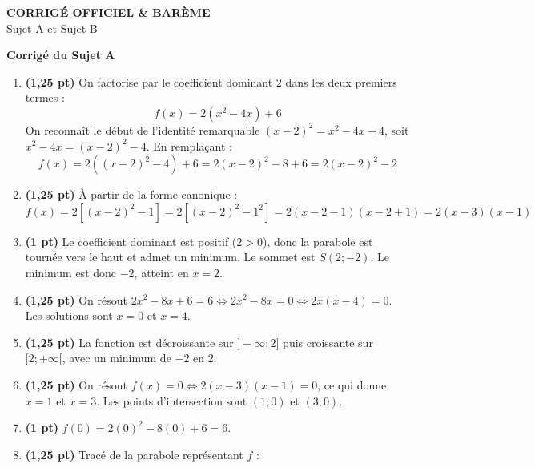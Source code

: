 \documentclass[11pt,a4paper]{article}
\newcommand{\partie}[1]{%
  \vspace{0.9em}%
  \noindent\textbf{#1}%
  \par\vspace{0.3em}%
}
\begin{document}
\newpage

\begin{center}
  {\LARGE \textbf{CORRIGÉ OFFICIEL \& BARÈME}}\\[0.4em]
  {\large Sujet A et Sujet B}
\end{center}

\partie{Corrigé du Sujet A}
\begin{enumerate}
    \item \textbf{(1,25 pt)} On factorise par le coefficient dominant $2$ dans les deux premiers termes :
    $$f(x) = 2(x^2 - 4x) + 6$$
    On reconnaît le début de l'identité remarquable $(x-2)^2 = x^2 - 4x + 4$, soit $x^2 - 4x = (x-2)^2 - 4$.
    En remplaçant :
    $$f(x) = 2\left((x-2)^2 - 4\right) + 6 = 2(x-2)^2 - 8 + 6 = 2(x-2)^2 - 2$$
    \item \textbf{(1,25 pt)} À partir de la forme canonique :
    $$f(x) = 2\left[(x-2)^2 - 1\right] = 2\left[(x-2)^2 - 1^2\right] = 2(x - 2 - 1)(x - 2 + 1) = 2(x - 3)(x - 1)$$
    \item \textbf{(1 pt)} Le coefficient dominant est positif ($2 > 0$), donc la parabole est tournée vers le haut et admet un minimum. Le sommet est $S(2 ; -2)$. Le minimum est donc $-2$, atteint en $x = 2$.
    \item \textbf{(1,25 pt)} On résout $2x^2 - 8x + 6 = 6 \iff 2x^2 - 8x = 0 \iff 2x(x - 4) = 0$. Les solutions sont $x = 0$ et $x = 4$.
    \item \textbf{(1,25 pt)} La fonction est décroissante sur $]-\infty ; 2]$ puis croissante sur $[2 ; +\infty[$, avec un minimum de $-2$ en $2$.
    \item \textbf{(1,25 pt)} On résout $f(x) = 0 \iff 2(x-3)(x-1) = 0$, ce qui donne $x = 1$ et $x = 3$. Les points d'intersection sont $(1 ; 0)$ et $(3 ; 0)$.
    \item \textbf{(1 pt)} $f(0) = 2(0)^2 - 8(0) + 6 = 6$.
    \item \textbf{(1,25 pt)} Tracé de la parabole représentant $f$ :
    
    \begin{center}
    \end{center}
\end{enumerate}
\end{document}
